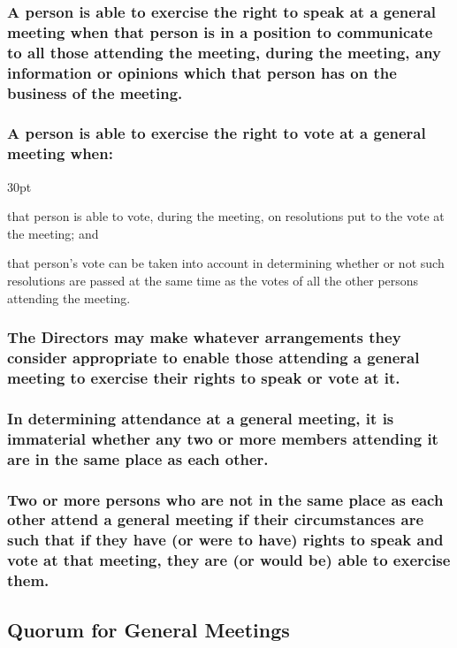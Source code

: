 \documentclass[12pt]{article}
\def\clauseindent{30pt}
\newenvironment{subindentpara}{\raggedright\begin{adjustwidth}{\clauseindent}{}\begin{hanginglist}}{\end{hanginglist}\end{adjustwidth}}
\begin{document}
\subsubsection[Specifics of Attendance at General Meetings]{A person is able to exercise the right to speak at a general meeting when that person is in a position to communicate to all those attending the meeting, during the meeting, any information or opinions which that person has on the business of the meeting.}
\subsubsection[Specifics of Voting at General Meetings]{A person is able to exercise the right to vote at a general meeting when:}
\begin{subindentpara}
    \item that person is able to vote, during the meeting, on resolutions put to the vote at the meeting; and
    \item that person's vote can be taken into account in determining whether or not such resolutions are passed at the same time as the votes of all the other persons attending the meeting.
\end{subindentpara}
\subsubsection[Directors May Make Arrangements to Enable Participation]{The Directors may make whatever arrangements they consider appropriate to enable those attending a general meeting to exercise their rights to speak or vote at it.}
\subsubsection[Attendees' Location at Meetings is Irrelevant]{In determining attendance at a general meeting, it is immaterial whether any two or more members attending it are in the same place as each other.}
\subsubsection[Attendees May Exercise Rights at Any Location]{Two or more persons who are not in the same place as each other attend a general meeting if their circumstances are such that if they have (or were to have) rights to speak and vote at that meeting, they are (or would be) able to exercise them.}

\subsection{Quorum for General Meetings}
\end{document}
